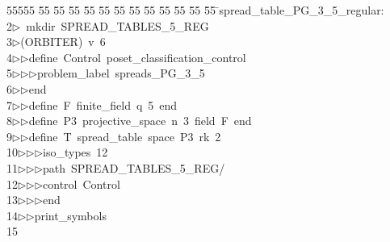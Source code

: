 %
%
\begin{tabbing}
55555 \= 55 \= 55 \= 55 \= 55 \= 55 \= 55 \= 55 \= 55 \= 55 \= 55 \= 55 \= 55 \= \>spread\_table\_PG\_3\_5\_regular:\\[0pt]
2\>$\triangleright$\>\ mkdir\ SPREAD\_TABLES\_5\_REG\\[0pt]
3\>$\triangleright$\>(ORBITER)\ v\ 6\ \\[0pt]
4\>$\triangleright$\>$\triangleright$\>define\ Control\ poset\_classification\_control\ \\[0pt]
5\>$\triangleright$\>$\triangleright$\>$\triangleright$\>problem\_label\ spreads\_PG\_3\_5\ \\[0pt]
6\>$\triangleright$\>$\triangleright$\>end\ \\[0pt]
7\>$\triangleright$\>$\triangleright$\>define\ F\ finite\_field\ q\ 5\ end\ \\[0pt]
8\>$\triangleright$\>$\triangleright$\>define\ P3\ projective\_space\ n\ 3\ field\ F\ end\ \\[0pt]
9\>$\triangleright$\>$\triangleright$\>define\ T\ spread\_table\ space\ P3\ rk\ 2\ \\[0pt]
10\>$\triangleright$\>$\triangleright$\>$\triangleright$\>iso\_types\ 12\ \\[0pt]
11\>$\triangleright$\>$\triangleright$\>$\triangleright$\>path\ SPREAD\_TABLES\_5\_REG/\ \\[0pt]
12\>$\triangleright$\>$\triangleright$\>$\triangleright$\>control\ Control\ \\[0pt]
13\>$\triangleright$\>$\triangleright$\>$\triangleright$\>end\ \\[0pt]
14\>$\triangleright$\>$\triangleright$\>print\_symbols\\[0pt]
15\>\end{tabbing}

